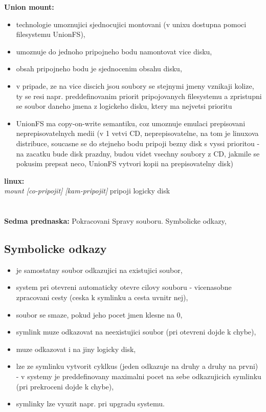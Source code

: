 \documentclass[a4paper, 11pt]{article}
\begin{document}
\textbf{Union mount:}
\begin{itemize}
    \item technologie umoznujici sjednocujici montovani (v unixu dostupna pomoci filesystemu UnionFS),
    \item umoznuje do jednoho pripojneho bodu namontovat vice disku,
    \item obsah pripojneho bodu je sjednocenim obsahu disku,
    \item v pripade, ze na vice discich jsou soubory se stejnymi jmeny vznikaji kolize, ty se resi napr. preddefinovanim priorit pripojovanych filesystemu a zpristupni se soubor daneho jmena z logickeho disku, ktery ma nejvetsi prioritu
    \item UnionFS ma copy-on-write semantiku, coz umoznuje emulaci prepisovani neprepisovatelnych medii (v 1 vetvi CD, neprepisovatelne, na tom je linuxova distribuce, soucasne se do stejneho bodu pripoji bezny disk s vyssi prioritou - na zacatku bude disk prazdny, budou videt vsechny soubory z CD, jakmile se pokusim prepsat neco, UnionFS vytvori kopii na prepisovatelny disk) \\
\end{itemize}

\textbf{linux:} \\[0.5em]
\textit{mount [co-pripojit] [kam-pripojit]} pripoji logicky disk \\

\newpage

\section{}
\textbf{Sedma prednaska:} Pokracovani Spravy souboru. Symbolicke odkazy, 
\subsection{Symbolicke odkazy}
\begin{itemize}
    \item je samostatny soubor odkazujici na existujici soubor,
    \item system pri otevreni automaticky otevre cilovy souboru - vicenasobne zpracovani cesty (ceska k symlinku a cesta uvnitr nej),
    \item soubor se smaze, pokud jeho pocet jmen klesne na 0,
    \item symlink muze odkazovat na neexistujici soubor (pri otevreni dojde k chybe),
    \item muze odkazovat i na jiny logicky disk,
    \item lze ze symlinku vytvorit cyklkus (jeden odkazuje na druhy a druhy na prvni) - v systemy je preddefinovany maximalni pocet na sebe odkazujicich symlinku (pri prekroceni dojde k chybe),
    \item symlinky lze vyuzit napr. pri upgradu systemu. \\
\end{itemize}
\end{document}
